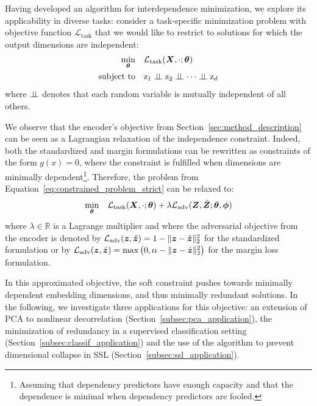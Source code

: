 \label{sec:applications}
Having developed an algorithm for interdependence minimization, we explore its applicability in diverse tasks: consider a task-specific minimization problem with objective function $\mathcal{L}_{\mathrm{task}}$ that we would like to restrict to solutions for which the output dimensions are independent:
\begin{equation} \label{eq:constrained_problem_strict}
\begin{aligned} %
    \underset{\vtheta}{\min} & \quad \mathcal{L}_{\mathrm{task}}(\mX, \cdot ; \vtheta) \\ \textrm{subject to} & \quad \rz_1 \indep \rz_2 \indep \cdots \indep \rz_d
\end{aligned}
\end{equation}
where $\perp \!\!\! \perp$ denotes that each random variable is mutually independent of all others. 

We observe that the encoder's objective from Section~\ref{sec:method_description} can be seen as a Lagrangian relaxation of the independence constraint. Indeed, both the standardized and margin formulations can be rewritten as constraints of the form $g(x) = 0$, where the constraint is fulfilled when dimensions are minimally dependent\footnote{Assuming that dependency predictors have enough capacity and that the dependence is minimal when dependency predictors are fooled.}. 
Therefore, the problem from Equation~\ref{eq:constrained_problem_strict} can be relaxed to:
\begin{equation} \label{eq:approx_problem}
    \underset{{\bm{\theta}}}{\min} \quad \mathcal{L}_{\mathrm{task}}({\bm{X}}, \cdot ; {\bm{\theta}}) + \lambda \mathcal{L}_{\mathrm{adv}}({\bm{Z}}, \hat{{\bm{Z}}}; {\bm{\theta}}, {\bm{\phi}})
\end{equation} %
where $\lambda \in \mathbb{R}$ is a Lagrange multiplier and where the adversarial objective from the encoder is denoted by $\mathcal{L}_{\mathrm{adv}}({\bm{z}}, \hat{{\bm{z}}}) = 1 - \lVert {\bm{z}} - \hat{{\bm{z}}} \rVert_2^2$ for the standardized formulation or by $\mathcal{L}_{\mathrm{adv}}({\bm{z}}, \hat{{\bm{z}}}) = \max \left(0, \alpha  - \lVert {\bm{z}} - \hat{{\bm{z}}} \rVert_2^2\right)$ for the margin loss formulation. 

In this approximated objective, the soft constraint pushes towards minimally dependent embedding dimensions, and thus minimally redundant solutions. 
In the following, we investigate three applications for this objective: an extension of PCA to nonlinear decorrelation (Section~\ref{subsec:pca_application}), the minimization of redundancy in a supervised classification setting (Section~\ref{subsec:classif_application}) and the use of the algorithm to prevent dimensional collapse in SSL (Section~\ref{subsec:ssl_application}). 

